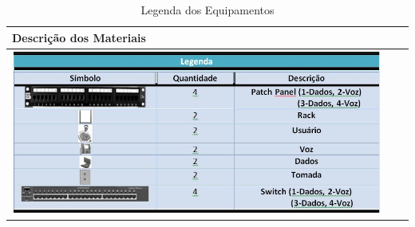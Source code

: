 \begin{table}[h!]
\centering
\caption{Legenda dos Equipamentos}
\label{tab2}
\begin{tabular}{|l|l|l|}
\hline
\multicolumn{1}{|l|}{Descrição dos Materiais} \\ \hline
\includegraphics[scale=0.5]{fig2}        \\ \hline

\end{tabular}
\end{table}